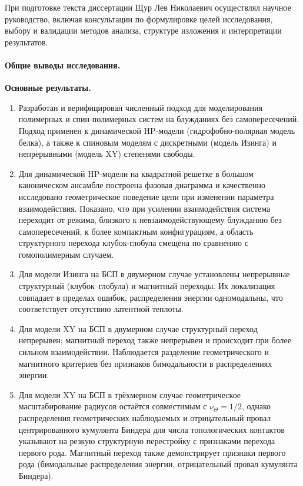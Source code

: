 При подготовке текста диссертации Щур Лев Николаевич осуществлял научное руководство, включая консультации по формулировке целей исследования, выбору и валидации методов анализа, структуре изложения и интерпретации результатов.


\paragraph*{Общие выводы исследования.}


\medskip
\noindent\textbf{Основные результаты.}
\begin{enumerate}
	\item Разработан и верифицирован численный подход для  моделирования полимерных и спин-полимерных систем на блужданиях без самопересечений.  
	 Подход применен к динамической HP-модели (гидрофобно-полярная модель белка), а также к спиновым моделям с дискретными (модель Изинга) и непрерывными (модель XY) степенями свободы.
	\item Для динамической HP-модели на квадратной решетке в большом каноническом ансамбле построена фазовая диаграмма и качественно исследовано геометрическое поведение цепи при изменении параметра взаимодействия. 
	Показано, что при усилении взаимодействия система переходит от режима, близкого к невзаимодействующему блужданию без самопересечений, к более компактным конфигурациям, а область структурного перехода клубок-глобула смещена по сравнению с гомополимерным случаем.
	\item Для модели Изинга на БСП в двумерном случае установлены непрерывные структурный (клубок–глобула) и магнитный переходы. 
	Их локализация совпадает в пределах ошибок, распределения энергии одномодальны, что соответствует отсутствию латентной теплоты.
	\item Для модели XY на БСП в двумерном случае структурный переход непрерывен; магнитный переход также непрерывен и происходит при более сильном взаимодействии. Наблюдается разделение геометрического и магнитного критериев без признаков бимодальности в распределениях энергии.
	\item  Для модели XY на БСП в трёхмерном случае геометрическое масштабирование
	радиусов остаётся совместимым с $\nu_{\Theta}=1/2$, однако распределения
	геометрических наблюдаемых и отрицательный провал центрированного
	кумулянта Биндера для числа топологических контактов указывают на
	резкую структурную перестройку с признаками перехода первого рода.
	Магнитный переход также демонстрирует признаки первого рода
	(бимодальные распределения энергии, отрицательный провал кумулянта Биндера).

\end{enumerate}
